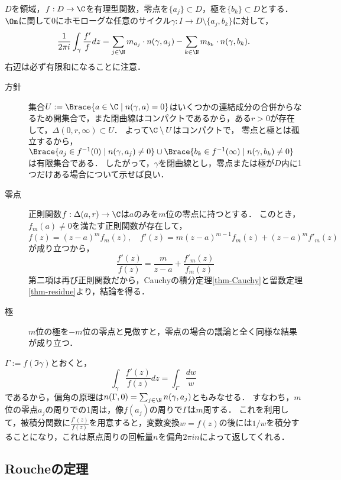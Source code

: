 \documentclass[uplatex, dvipdfmx]{jsreport}
\begin{document}
\begin{theorem}[偏角の定理]\label{thm-argument-principle}
    $D$を領域，$f:D\to\C$を有理型関数，零点を$\{a_j\}\subset D$，極を$\{b_k\}\subset D$とする．
    $\Om$に関して$0$にホモローグな任意のサイクル$\gamma:I\to D\setminus\{a_j,b_k\}$に対して，
    \[\frac{1}{2\pi i}\int_\gamma\frac{f'}{f}dz=\sum_{j\in\N}m_{a_j}\cdot n(\gamma,a_j)-\sum_{k\in\N}m_{b_k}\cdot n(\gamma,b_k).\]
    右辺は必ず有限和になることに注意．
\end{theorem}
\begin{Proof}\mbox{}
    \begin{description}
        \item[方針] 集合$U:=\Brace{a\in\C\mid n(\gamma,a)=0}$はいくつかの連結成分の合併からなるため開集合で，また閉曲線はコンパクトであるから，ある$r>0$が存在して，$\Delta(0,r,\infty)\subset U$．
        よって$\C\setminus U$はコンパクトで，
        零点と極とは孤立するから，$\Brace{a_j\in f^{-1}(0)\mid n(\gamma,a_j)\ne 0}\cup\Brace{b_k\in f^{-1}(\infty)\mid n(\gamma,b_k)\ne0}$は有限集合である．
        したがって，$\gamma$を閉曲線とし，零点または極が$D$内に1つだけある場合について示せば良い．
        \item[零点]
        正則関数$f:\Delta(a,r)\to\C$は$a$のみを$m$位の零点に持つとする．
        このとき，$f_m(a)\ne0$を満たす正則関数が存在して，
        \[f(z)=(z-a)^mf_m(z),\quad f'(z)=m(z-a)^{m-1}f_m(z)+(z-a)^{m}f'_m(z)\]
        が成り立つから，
        \[\frac{f'(z)}{f(z)}=\frac{m}{z-a}+\frac{f'_m(z)}{f_m(z)}\]
        第二項は再び正則関数だから，Cauchyの積分定理\ref{thm-Cauchy}と留数定理\ref{thm-residue}より，結論を得る．
        \item[極] $m$位の極を$-m$位の零点と見做すと，零点の場合の議論と全く同様な結果が成り立つ．
    \end{description}
\end{Proof}
\begin{remarks}
    $\Gamma:=f(\Im\gamma)$とおくと，
    \[\int_\gamma\frac{f'(z)}{f(z)}dz=\int_\Gamma\frac{dw}{w}\]
    であるから，偏角の原理は$n(\Gamma,0)=\sum_{j\in\N}n(\gamma,a_j)$ともみなせる．
    すなわち，$m$位の零点$a_j$の周りでの1周は，像$f(a_j)$の周りで$\Gamma$は$m$周する．
    これを利用して，被積分関数に$\frac{f'(z)}{f(z)}$を用意すると，変数変換$w=f(z)$の後には$1/w$を積分することになり，これは原点周りの回転量$n$を偏角$2\pi in$によって返してくれる．
\end{remarks}

\subsection{Roucheの定理}
\end{document}
